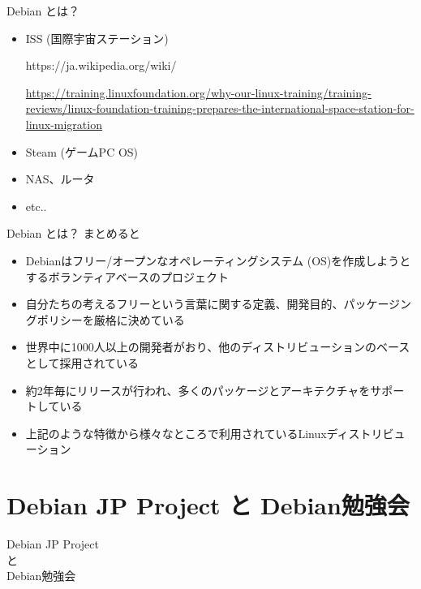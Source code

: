 \begin{frame}{Debian とは？}

\begin{itemize}
\item ISS (国際宇宙ステーション)
\begin{center}
 https://ja.wikipedia.org/wiki/%
\end{center}
{\tiny \url{https://training.linuxfoundation.org/why-our-linux-training/training-reviews/linux-foundation-training-prepares-the-international-space-station-for-linux-migration}}

\item Steam (ゲームPC OS)
\item NAS、ルータ
\item etc..
\end{itemize}

\end{frame}

\fi


\begin{frame}{Debian とは？}
まとめると
\begin{itemize}
  \item Debianはフリー/オープンなオペレーティングシステム (OS)を作成しようとするボランティアベースのプロジェクト
  \item 自分たちの考えるフリーという言葉に関する定義、開発目的、パッケージングポリシーを厳格に決めている
  \item 世界中に1000人以上の開発者がおり、他のディストリビューションのベースとして採用されている
  \item 約2年毎にリリースが行われ、多くのパッケージとアーキテクチャをサポートしている
  \item 上記のような特徴から様々なところで利用されているLinuxディストリビューション
\end{itemize}

\end{frame}



\section{Debian JP Project と Debian勉強会}


\begin{frame}
  \begin{center}\Huge{Debian JP Project\\と\\Debian勉強会}\end{center}
\end{frame}

